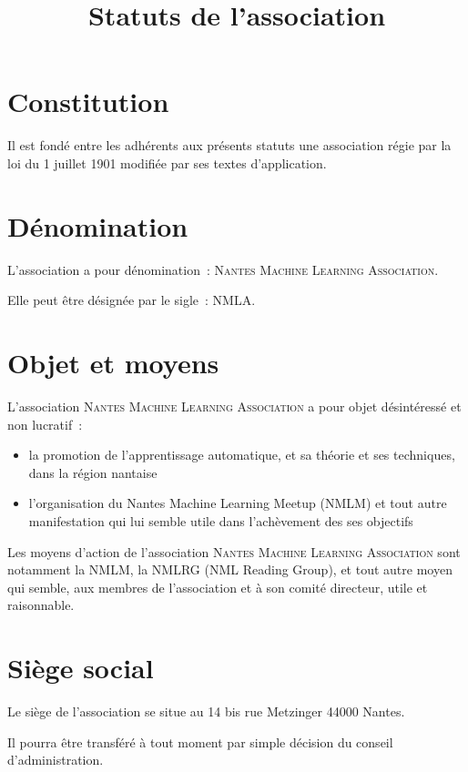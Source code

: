 \documentclass[12 pt]{article}
\title{Statuts de l'association \\
  \Nom}
\date{}
\newcommand{\Nom}{\textsc{Nantes Machine Learning Association}}
\newcommand{\Sigle}{NMLA}
\begin{document}
\maketitle

\section{Constitution}
\label{sec:constitution}

Il est fondé entre les adhérents aux présents statuts une association
régie par la loi du 1\ier{} juillet 1901 modifiée par ses textes
d'application.

\section{Dénomination}
\label{sec:denomination}
L'association a pour dénomination~: \og\Nom\fg.

Elle peut être désignée par le sigle~: \og\Sigle\fg.

\section{Objet et moyens}
\label{sec:objet-et-moyens}

L'association \Nom{} a pour objet désintéressé et non lucratif~:

\begin{itemize}
\item la promotion de l'apprentissage automatique, et sa théorie et
  ses techniques, dans la région nantaise
\item l'organisation du Nantes Machine Learning Meetup (NMLM) et tout
  autre manifestation qui lui semble utile dans l'achèvement des ses objectifs
\end{itemize}

Les moyens d'action de l'association \Nom{} sont notamment la NMLM, la
NMLRG (NML Reading Group), et tout autre moyen qui semble, aux membres
de l'association et à son comité directeur, utile et raisonnable.

\section{Siège social}
\label{sec:siege-social}

Le siège de l'association se situe au 14 bis rue Metzinger 44000 Nantes.

Il pourra être transféré à tout moment par simple décision du conseil
d'administration.
\end{document}
